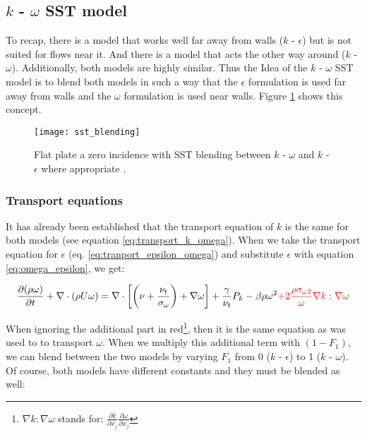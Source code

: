 \subsection{$k$ - $\omega$ SST model}
To recap, there is a model that works well far away from walls ($k$ -
$\epsilon$) but is not suited for flows near it. And there is a model that acts
the other way around ($k$ - $\omega$). Additionally, both models are highly
similar. Thus the Idea of the $k$ - $\omega$ SST model is to blend both models
in such a way that the $\epsilon$ formulation is used far away from walls and
the $\omega$ formulation is used near walls. Figure \ref{fig:sst_blending}
shows this concept.

\begin{figure}[H] \centering
    \texttt{[image: sst\_blending]}
    \caption{Flat plate a zero incidence with SST blending between $k$ -
    $\omega$ and $k$ - $\epsilon$ where appropriate \cite{cfd101_k-omega}.}
    \label{fig:sst_blending}
\end{figure}


\subsubsection{Transport equations}
It has already been established that the transport equation of $k$ is the same
for both models (see equation \ref{eq:transport_k_omega}). When we take the
transport equation for $\epsilon$ (eq. \ref{eq:tranport_epsilon_omega}) and
substitute $\epsilon$ with equation \ref{eq:omega_epsilon}, we get:

\begin{equation}
    \frac{\partial (\rho \omega)}{\partial t} + 
    \nabla \cdot (\rho U \omega) =
    \nabla \cdot \left[ 
        \left( \nu + \frac{\nu_t}{\sigma_{\omega}}\right) + \nabla  \omega
    \right] + \frac{\gamma}{\nu_t} P_k - \beta \rho \omega^2 
    \textcolor{red}{
        + 2 \frac{\rho \sigma_{\omega 2}}{\omega} \nabla k : \nabla \omega
    }
\end{equation}

\noindent When ignoring the additional part in red\footnote{$\nabla k : \nabla
\omega$ stands for: $\frac{\partial k}{\partial x_j} \frac{\partial
\omega}{\partial x_j}$}, then it is the same equation as was used to to
transport $\omega$. When we multiply this additional term with $(1 - F_1)$, we
can blend between the two models by varying $F_1$ from 0 ($k$ - $\epsilon$) to
1 ($k$ - $\omega$). Of course, both models have different constants and they
must be blended as well:

